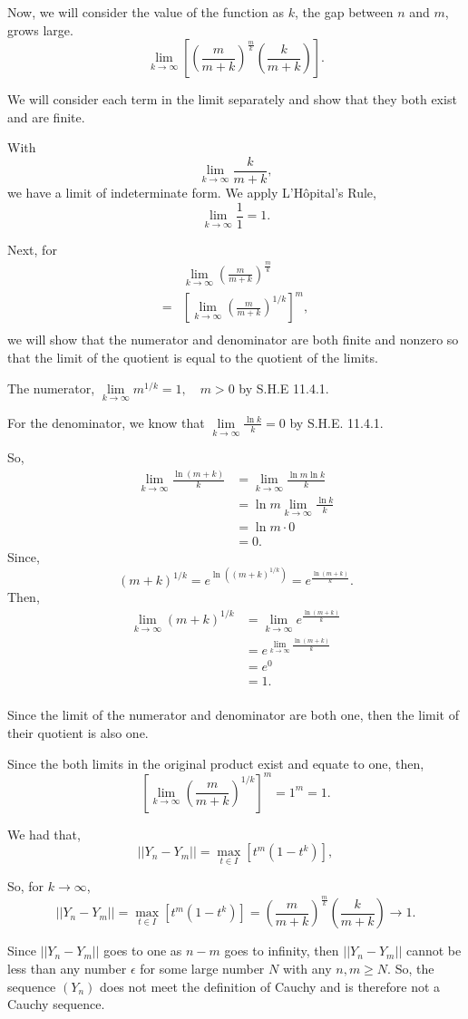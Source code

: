 \documentclass[../hw5]{subfiles}
\begin{document}
Now, we will consider the value of the function as $k$, the gap between $n$ and $m$, grows large.
\[\lim\limits_{k\to\infty}\left[ {\left( \frac{m}{m+k} \right)}^{\frac{m}{k}}\left( \frac{k}{m+k} \right) \right].\]

We will consider each term in the limit separately and show that they both exist and are finite.

With
\[\lim\limits_{k\to\infty}\frac{k}{m+k},\]
we have a limit of indeterminate form. We apply L'Hôpital's Rule,
\[\lim\limits_{k\to\infty}\frac{1}{1}=1.\]

Next, for
\begin{align*}
    &\lim\limits_{k\to\infty}{\left( \frac{m}{m+k} \right)}^{\frac{m}{k}}\\
    =&{\left[ \lim\limits_{k\to\infty}{\left( \frac{m}{m+k} \right)}^{1/k} \right]}^m,\\
\end{align*}
we will show that the numerator and denominator are both finite and nonzero so that the limit of the quotient is equal to the quotient of the limits.

The numerator, $\lim\limits_{k\to\infty}m^{1/k}=1, \quad m>0$ by S.H.E 11.4.1.

For the denominator, we know that $\lim\limits_{k\to\infty}\frac{\ln{k}}{k}=0$ by S.H.E. 11.4.1.

So,
\begin{align*}
    \lim\limits_{k\to\infty}\frac{\ln{(m+k)}}{k}&=\lim\limits_{k\to\infty}\frac{\ln{m}\ln{k}}{k}\\
    &=\ln{m}\lim\limits_{k\to\infty}\frac{\ln{k}}{k}\\
    &=\ln{m}\cdot 0\\
    &=0.
\end{align*}
Since,
\[{(m+k)}^{1/k}=e^{\ln{\left( {(m+k)}^{1/k} \right)}}=e^{\frac{\ln{(m+k)}}{k}}.\]
Then,
\begin{align*}
    \lim\limits_{k\to\infty}{(m+k)}^{1/k}&=\lim\limits_{k\to\infty}e^{\frac{\ln{(m+k)}}{k}}\\
    &=e^{\lim\limits_{k\to\infty}\frac{\ln{(m+k)}}{k}}\\
    &=e^0\\
    &=1.\\
\end{align*}

Since the limit of the numerator and denominator are both one, then the limit of their quotient is also one.

Since the both limits in the original product exist and equate to one, then,
\[{\left[ \lim\limits_{k\to\infty}{\left( \frac{m}{m+k} \right)}^{1/k} \right]}^m=1^m=1.\]

We had that,
\[||Y_n-Y_m||=\underset{t\in I}{\max}\left[ t^m\left( 1-t^k \right) \right],\]

So, for $k\to\infty$,
\[||Y_n-Y_m||=\underset{t\in I}{\max}\left[ t^m\left( 1-t^k \right) \right]={\left( \frac{m}{m+k} \right)}^{\frac{m}{k}}\left( \frac{k}{m+k} \right)\to1.\]

Since $||Y_n-Y_m||$ goes to one as $n-m$ goes to infinity, then $||Y_n-Y_m||$ cannot be less than any number $\epsilon$ for some large number $N$ with any $n,m\geq N$. So, the sequence $(Y_n)$ does not meet the definition of Cauchy and is therefore not a Cauchy sequence.
\end{document}
